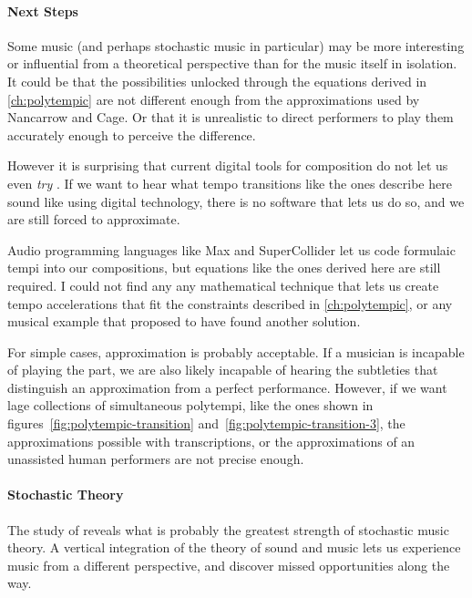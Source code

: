\paragraph{Next Steps} Some music (and perhaps stochastic music in
particular) may be more interesting or influential from a theoretical
perspective than for the music itself in isolation. It could be that
the possibilities unlocked through the equations derived in
\autoref{ch:polytempic} are not different enough from the
approximations used by Nancarrow and Cage. Or that it is unrealistic
to direct performers to play them accurately enough to perceive the
difference.

However it is surprising that current digital tools for composition do
not let us even \emph{try} \polytempic. If we want to hear what tempo
transitions like the ones describe here sound like using digital
technology, there is no software that lets us do so, and we are still
forced to approximate. 

Audio programming languages like Max and SuperCollider let us code
formulaic tempi into our compositions, but equations like the ones
derived here are still required. I could not find any any mathematical
technique that lets us create tempo accelerations that fit the
constraints described in \autoref{ch:polytempic}, or any musical
example that proposed to have found another solution.

For simple cases, approximation is probably acceptable. If a musician
is incapable of playing the part, we are also likely incapable of
hearing the subtleties that distinguish an approximation from a
perfect performance. However, if we want lage collections of
simultaneous polytempi, like the ones shown in
figures~\ref{fig:polytempic-transition}
and~\ref{fig:polytempic-transition-3}, the approximations possible
with transcriptions, or the approximations of an unassisted human
performers are not precise enough.

\paragraph{Stochastic Theory} The study of \polytempic reveals what is
probably the greatest strength of stochastic music theory. A vertical
integration of the theory of sound and music lets us experience music
from a different perspective, and discover missed opportunities along the
way. 

